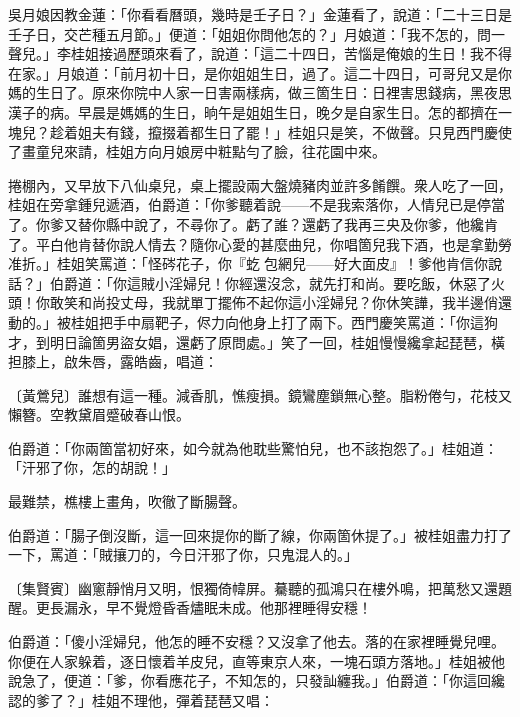 吳月娘因教金蓮：「你看看曆頭，幾時是壬子日？」金蓮看了，說道：「二十三日是壬子日，交芒種五月節。」便道：「姐姐你問他怎的？」月娘道：「我不怎的，問一聲兒。」李桂姐接過歷頭來看了，說道：「這二十四日，苦惱是俺娘的生日！{}我不得在家。」月娘道：「前月初十日，是你姐姐生日，過了。這二十四日，可哥兒又是你媽的生日了。原來你院中人家一日害兩樣病，做三箇生日：日裡害思錢病，黑夜思漢子的病。早晨是媽媽的生日，晌午是姐姐生日，晚夕是自家生日。怎的都擠在一塊兒？趁着姐夫有錢，攛掇着都生日了罷！」桂姐只是笑，不做聲。只見西門慶使了畫童兒來請，桂姐方向月娘房中粧點勻了臉，往花園中來。

捲棚內，又早放下八仙桌兒，桌上擺設兩大盤燒豬肉並許多餚饌。衆人吃了一回，桂姐在旁拿鍾兒遞酒，伯爵道：「你爹聽着說——不是我索落你，人情兒已是停當了。你爹又替你縣中說了，不尋你了。虧了誰？還虧了我再三央及你爹，他纔肯了。平白他肯替你說人情去？{}隨你心愛的甚麼曲兒，你唱箇兒我下酒，也是拿勤勞准折。」桂姐笑罵道：「怪硶花子，你『虼𧒮包網兒——好大面皮』！爹他肯信你說話？」伯爵道：「你這賊小淫婦兒！你經還沒念，就先打和尚。要吃飯，休惡了火頭！你敢笑和尚投丈母，我就單丁擺佈不起你這小淫婦兒？你休笑譁，我半邊俏還動的。」被桂姐把手中扇靶子，侭力向他身上打了兩下。西門慶笑罵道：「你這狗才，到明日論箇男盜女娼，還虧了原問處。」笑了一回，桂姐慢慢纔拿起琵琶，橫担膝上，啟朱唇，露皓齒，唱道：

\begin{myquote} 
{\markfont\small〔黃鶯兒〕}誰想有這一種。減香肌，憔瘦損。鏡鸞塵鎖無心整。脂粉倦勻，花枝又懶簪。空教黛眉蹙破春山恨。
\end{myquote} 

伯爵道：「你兩箇當初好來，如今就為他耽些驚怕兒，也不該抱怨了。」桂姐道：「汗邪了你，怎的胡說！」

\begin{myquote} 
最難禁，樵樓上畫角，吹徹了斷腸聲。
\end{myquote} 

伯爵道：「腸子倒沒斷，這一回來提你的斷了線，你兩箇休提了。」被桂姐盡力打了一下，罵道：「賊攘刀的，今日汗邪了你，只鬼混人的。」

\begin{myquote} 
{\markfont\small〔集賢賓〕}幽窻靜悄月又明，恨獨倚幃屏。驀聽的孤鴻只在樓外鳴，把萬愁又還題醒。更長漏永，早不覺燈昏香燼眠未成。他那裡睡得安穩！
\end{myquote} 

伯爵道：「傻小淫婦兒，他怎的睡不安穩？又沒拿了他去。落的在家裡睡覺兒哩。你便在人家躲着，逐日懷着羊皮兒，直等東京人來，一塊石頭方落地。」桂姐被他說急了，便道：「爹，你看應花子，不知怎的，只發訕纏我。」伯爵道：「你這回纔認的爹了？」{}桂姐不理他，彈着琵琶又唱：

